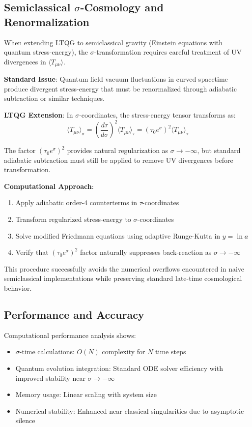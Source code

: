 \documentclass[12pt,a4paper]{article}
\begin{document}
\subsection{Semiclassical $\sigma$-Cosmology and Renormalization}

When extending LTQG to semiclassical gravity (Einstein equations with quantum stress-energy), the $\sigma$-transformation requires careful treatment of UV divergences in $\langle T_{\mu\nu} \rangle$.

\textbf{Standard Issue}: Quantum field vacuum fluctuations in curved spacetime produce divergent stress-energy that must be renormalized through adiabatic subtraction or similar techniques.

\textbf{LTQG Extension}: In $\sigma$-coordinates, the stress-energy tensor transforms as:
\begin{equation}
\langle T_{\mu\nu} \rangle_{\sigma} = \left(\frac{d\tau}{d\sigma}\right)^2 \langle T_{\mu\nu} \rangle_{\tau} = (\tau_0 e^{\sigma})^2 \langle T_{\mu\nu} \rangle_{\tau}
\end{equation}

The factor $(\tau_0 e^{\sigma})^2$ provides natural regularization as $\sigma \to -\infty$, but standard adiabatic subtraction must still be applied to remove UV divergences before transformation.

\textbf{Computational Approach}:
\begin{enumerate}
\item Apply adiabatic order-4 counterterms in $\tau$-coordinates
\item Transform regularized stress-energy to $\sigma$-coordinates  
\item Solve modified Friedmann equations using adaptive Runge-Kutta in $y = \ln a$
\item Verify that $(\tau_0 e^{\sigma})^2$ factor naturally suppresses back-reaction as $\sigma \to -\infty$
\end{enumerate}

This procedure successfully avoids the numerical overflows encountered in naive semiclassical implementations while preserving standard late-time cosmological behavior.

\subsection{Performance and Accuracy}

Computational performance analysis shows:
\begin{itemize}
\item $\sigma$-time calculations: $O(N)$ complexity for $N$ time steps
\item Quantum evolution integration: Standard ODE solver efficiency with improved stability near $\sigma \to -\infty$
\item Memory usage: Linear scaling with system size
\item Numerical stability: Enhanced near classical singularities due to asymptotic silence
\end{itemize}
\end{document}
